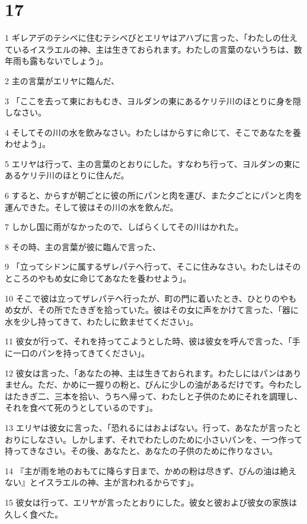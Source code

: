 \chapter{17}

\par 1 ギレアデのテシベに住むテシベびとエリヤはアハブに言った、「わたしの仕えているイスラエルの神、主は生きておられます。わたしの言葉のないうちは、数年雨も露もないでしょう」。
\par 2 主の言葉がエリヤに臨んだ、
\par 3 「ここを去って東におもむき、ヨルダンの東にあるケリテ川のほとりに身を隠しなさい。
\par 4 そしてその川の水を飲みなさい。わたしはからすに命じて、そこであなたを養わせよう」。
\par 5 エリヤは行って、主の言葉のとおりにした。すなわち行って、ヨルダンの東にあるケリテ川のほとりに住んだ。
\par 6 すると、からすが朝ごとに彼の所にパンと肉を運び、また夕ごとにパンと肉を運んできた。そして彼はその川の水を飲んだ。
\par 7 しかし国に雨がなかったので、しばらくしてその川はかれた。
\par 8 その時、主の言葉が彼に臨んで言った、
\par 9 「立ってシドンに属するザレパテへ行って、そこに住みなさい。わたしはそのところのやもめ女に命じてあなたを養わせよう」。
\par 10 そこで彼は立ってザレパテへ行ったが、町の門に着いたとき、ひとりのやもめ女が、その所でたきぎを拾っていた。彼はその女に声をかけて言った、「器に水を少し持ってきて、わたしに飲ませてください」。
\par 11 彼女が行って、それを持ってこようとした時、彼は彼女を呼んで言った、「手に一口のパンを持ってきてください」。
\par 12 彼女は言った、「あなたの神、主は生きておられます。わたしにはパンはありません。ただ、かめに一握りの粉と、びんに少しの油があるだけです。今わたしはたきぎ二、三本を拾い、うちへ帰って、わたしと子供のためにそれを調理し、それを食べて死のうとしているのです」。
\par 13 エリヤは彼女に言った、「恐れるにはおよばない。行って、あなたが言ったとおりにしなさい。しかしまず、それでわたしのために小さいパンを、一つ作って持ってきなさい。その後、あなたと、あなたの子供のために作りなさい。
\par 14 『主が雨を地のおもてに降らす日まで、かめの粉は尽きず、びんの油は絶えない』とイスラエルの神、主が言われるからです」。
\par 15 彼女は行って、エリヤが言ったとおりにした。彼女と彼および彼女の家族は久しく食べた。
